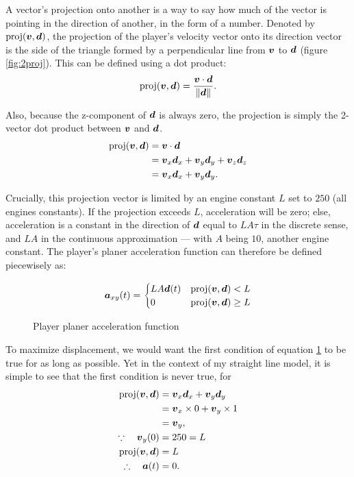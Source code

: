 A vector's projection onto another is a way to say how much of the vector is pointing in the direction of another, in the form of a number. Denoted by $\text{proj}(\boldsymbol{v}, \boldsymbol{d})$, the projection of the player's velocity vector onto its direction vector is the side of the triangle formed by a perpendicular line from $\boldsymbol{v}$ to $\boldsymbol{d}$ (figure \ref{fig:2proj}). This can be defined using a dot product:
\[
    \text{proj}(\boldsymbol{v}, \boldsymbol{d}) = \frac{\boldsymbol{v} \cdot \boldsymbol{d}}{\|\boldsymbol{d}\|}.
\]

Also, because the z-component of $\boldsymbol{d}$ is always zero, the projection is simply the 2-vector dot product between $\boldsymbol{v}$ and $\boldsymbol{d}$.
\begin{align*}
    \text{proj}(\boldsymbol{v}, \boldsymbol{d}) &= \boldsymbol{v} \cdot \boldsymbol{d}\\
    &= \boldsymbol{v}_x \boldsymbol{d}_x + \boldsymbol{v}_y \boldsymbol{d}_y + \boldsymbol{v}_z \boldsymbol{d}_z\\
    &= \boldsymbol{v}_x \boldsymbol{d}_x + \boldsymbol{v}_y \boldsymbol{d}_y.
\end{align*}

Crucially, this projection vector is limited by an engine constant $L$ set to $250$ (all engines constants). If the projection exceeds $L$, acceleration will be zero; else, acceleration is a constant in the direction of $\boldsymbol{d}$ equal to $LA\tau$ in the discrete sense, and $LA$ in the continuous approximation --- with $A$ being $10$, another engine constant. The player's planer acceleration function can therefore be defined piecewisely as:
\begin{figure}[H]
    \centering
    \[
        \boldsymbol{a}_{xy}(t) = \begin{cases}
            LA \boldsymbol{d}(t) & \text{proj}(\boldsymbol{v}, \boldsymbol{d}) < L\\
            0 & \text{proj}(\boldsymbol{v}, \boldsymbol{d}) \geq L
        \end{cases}
    \]
        \caption{Player planer acceleration function}
    \label{eq:playeracceleration}

\end{figure}

To maximize displacement, we would want the first condition of equation \ref{eq:playeracceleration} to be true for as long as possible. Yet in the context of my straight line model, it is simple to see that the first condition is never true, for
\begin{align*}
    \text{proj}(\boldsymbol{v}, \boldsymbol{d}) &= \boldsymbol{v}_x \boldsymbol{d}_x + \boldsymbol{v}_y \boldsymbol{d}_y\\
    &= \boldsymbol{v}_x \times 0 + \boldsymbol{v}_y \times 1\\
    &= \boldsymbol{v}_y,\\
    \because \quad \boldsymbol{v}_{y}(0) &= 250 = L\\
    \text{proj}(\boldsymbol{v}, \boldsymbol{d}) &= L\\
    \therefore  \quad \boldsymbol{a}(t) &= 0.
\end{align*}

